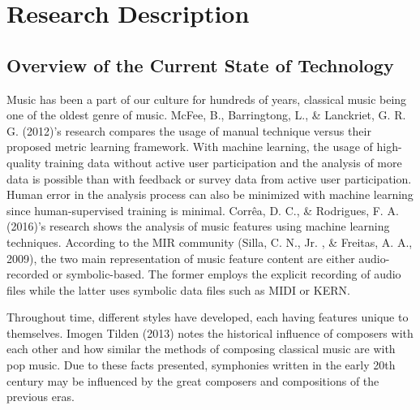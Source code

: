%
%
%                 

\chapter{Research Description}
\label{sec:researchdesc}    %

\section{Overview of the Current State of Technology}
\label{sec:overview}
Music has been a part of our culture for hundreds of years, classical music being one of the oldest genre of music. McFee, B., Barringtong, L., \& Lanckriet, G. R. G. (2012)’s research compares the usage of manual technique versus their proposed metric learning framework. With machine learning, the usage of high-quality training data without active user participation and the analysis of more data is possible than with feedback or survey data from active user participation. Human error in the analysis process can also be minimized with machine learning since human-supervised training is minimal. Corrêa, D. C., \& Rodrigues, F. A. (2016)’s research shows the analysis of music features using machine learning techniques. According to the MIR community (Silla, C. N., Jr. , \& Freitas, A. A., 2009), the two main representation of music feature content are either audio-recorded or symbolic-based. The former employs the explicit recording of audio files while the latter uses symbolic data files such as MIDI or KERN.

Throughout time, different styles have developed, each having features unique to themselves. Imogen Tilden (2013) notes the historical influence of composers with each other and how similar the methods of composing classical music are with pop music.  Due to these facts presented, symphonies written in the early 20th century may be influenced by the great composers and compositions of the previous eras. 


